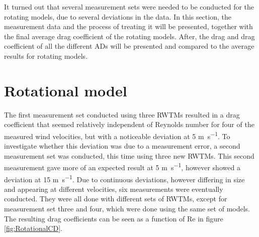
It turned out that several measurement sets were needed to be conducted for the rotating models, due to several deviations in the data. In this section, the measurement data and the process of treating it will be presented, together with the final average drag coefficient of the rotating models. After, the drag and drag coefficient of all the different \gls{AD}s will be presented and compared to the average results for rotating models.  



\section{Rotational model}

The first measurement set conducted using three \gls{RWTM}s resulted in a drag coefficient that seemed relatively independent of Reynolds number for four of the measured wind velocities, but with a noticeable deviation at 5 \si{\m\per\s}. To investigate whether this deviation was due to a measurement error, a second measurement set was conducted, this time using three new \gls{RWTM}s. This second measurement gave more of an expected result at 5 \si{\m\per\s}, however showed a deviation at 15 \si{\m\per\s}. Due to continuous deviations, however differing in size and appearing at different velocities, six measurements were eventually conducted. They were all done with different sets of \gls{RWTM}s, except for measurement set three and four, which were done using the same set of models. The resulting drag coefficients can be seen as a function of Re in figure \ref{fig:RotationalCD}.


